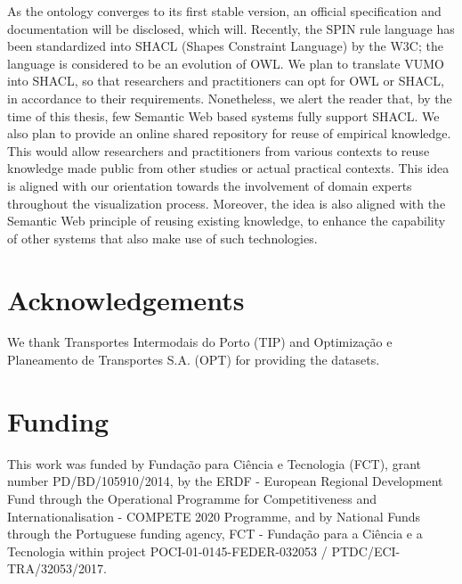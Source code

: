 \documentclass[]{interact}
\theoremstyle{plain}%
\theoremstyle{definition}
\theoremstyle{remark}
\theoremstyle{definition}
\begin{document}
As the ontology converges to its first stable version, an official specification and documentation will be disclosed, which will. Recently, the SPIN rule language has been standardized into SHACL (Shapes Constraint Language) by the W3C; the language is considered to be an evolution of OWL. We plan to translate VUMO into SHACL, so that researchers and practitioners can opt for OWL or SHACL, in accordance to their requirements. Nonetheless, we alert the reader that, by the time of this thesis, few Semantic Web based systems fully support SHACL. We also plan to provide an online shared repository for reuse of empirical knowledge. This would allow researchers and practitioners from various contexts to reuse knowledge made public from other studies or actual practical contexts. This idea is aligned with our orientation towards the involvement of domain experts throughout the visualization process. Moreover, the idea is also aligned with the Semantic Web principle of reusing existing knowledge, to enhance the capability of other systems that also make use of such technologies.

\section*{Acknowledgements}

 We thank Transportes Intermodais do Porto (TIP) and Optimiza\c{c}\~{a}o e Planeamento de Transportes S.A. (OPT) for providing the datasets.



\section*{Funding}

This work was funded by Funda\c{c}\~{a}o para Ci\^{e}ncia e Tecnologia (FCT), grant number PD/BD/105910/2014, by the ERDF - European Regional Development Fund through the Operational Programme for Competitiveness and Internationalisation - COMPETE 2020 Programme, and by National Funds through the Portuguese funding agency, FCT - Fundação para a Ciência e a Tecnologia within project POCI-01-0145-FEDER-032053 / PTDC/ECI-TRA/32053/2017.




\end{document}
